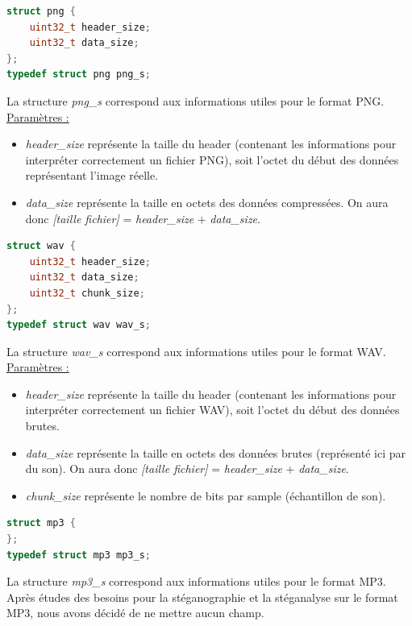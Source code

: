 \documentclass[11pt]{article}
\begin{document}
\begin{lstlisting}[language=c]
struct png {
    uint32_t header_size;
    uint32_t data_size;
};
typedef struct png png_s;
\end{lstlisting}

La structure \textit{png\_s} correspond aux informations 
utiles pour le format PNG.  
\newline
\underline{Paramètres :}
\begin{itemize}
\item \textit{header\_size} représente la taille du header (contenant les 
informations pour interpréter correctement un fichier PNG), soit l'octet 
du début des données représentant l'image réelle. 
\item \textit{data\_size} représente la taille en octets des données compressées. 
On aura donc \newline
\textit{[taille fichier]} = \textit{header\_size} + \textit{data\_size}.
\newline
\end{itemize}

\begin{lstlisting}[language=c]
struct wav {
    uint32_t header_size;
    uint32_t data_size;
    uint32_t chunk_size;
};
typedef struct wav wav_s;
\end{lstlisting}

La structure \textit{wav\_s} correspond aux informations 
utiles pour le format WAV.  
\newline
\underline{Paramètres :}
\begin{itemize}
\item \textit{header\_size} représente la taille du header (contenant les 
informations pour interpréter correctement un fichier WAV), soit l'octet 
du début des données brutes. 
\item \textit{data\_size} représente la taille en octets des données brutes 
(représenté ici par du son). On aura donc 
\textit{[taille fichier]} = \textit{header\_size} + \textit{data\_size}.
\item \textit{chunk\_size} représente le nombre de bits par sample (échantillon 
de son). 
\newline
\end{itemize}

\begin{lstlisting}[language=c]
struct mp3 {
};
typedef struct mp3 mp3_s;
\end{lstlisting}

La structure \textit{mp3\_s} correspond aux informations 
utiles pour le format MP3.  
\newline
Après études des besoins pour la stéganographie et la stéganalyse sur le 
format MP3, nous avons décidé de ne mettre aucun champ. 
\newline
\end{document}
